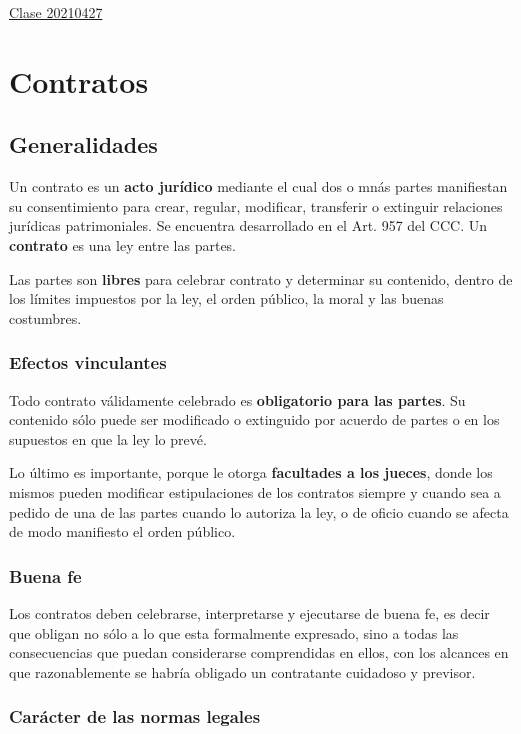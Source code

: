 \documentclass[../main.tex]{subfiles}
\begin{document}
\href{https://youtu.be/ijOuly7QM9o}{Clase 20210427}

\section{Contratos}

\subsection{Generalidades}

Un contrato es un \textbf{acto jurídico} mediante el cual dos o mnás partes
manifiestan su consentimiento para crear, regular, modificar, transferir o
extinguir relaciones jurídicas patrimoniales. Se encuentra desarrollado en el
Art. 957 del CCC. Un \textbf{contrato} es una ley entre las partes.

Las partes son \textbf{libres} para celebrar contrato y determinar su contenido,
dentro de los límites impuestos por la ley, el orden público, la moral y las
buenas costumbres.

\subsubsection{Efectos vinculantes}

Todo contrato válidamente celebrado es \textbf{obligatorio para las partes}. Su
contenido sólo puede ser modificado o extinguido por acuerdo de partes o en 
los supuestos en que la ley lo prevé.

Lo último es importante, porque le otorga \textbf{facultades a los jueces}, donde
los mismos pueden modificar estipulaciones de los contratos siempre y cuando sea
a pedido de una de las partes cuando lo autoriza la ley, o de oficio cuando se
afecta de modo manifiesto el orden público.

\subsubsection{Buena fe}

Los contratos deben celebrarse, interpretarse y ejecutarse de buena fe, es decir
que obligan no sólo a lo que esta formalmente expresado, sino a todas las
consecuencias que puedan considerarse comprendidas en ellos, con los alcances en
que razonablemente se habría obligado un contratante cuidadoso y previsor.

\subsubsection{Carácter de las normas legales}
\end{document}
